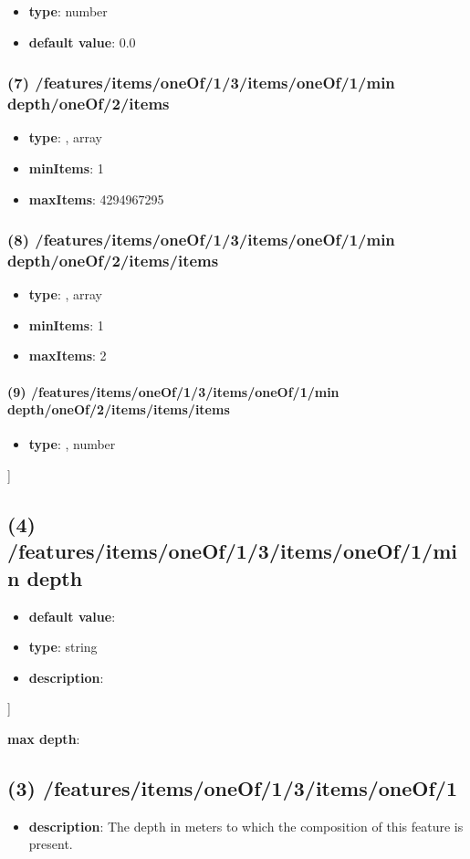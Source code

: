 \begin{itemize}[leftmargin=8em]\item {\bf type}: number\item {\bf default value}: 0.0
\end{itemize}\subsubsection{(7) /features/items/oneOf/1/3/items/oneOf/1/min depth/oneOf/2/items}
\begin{itemize}[leftmargin=7em]\item {\bf type}: , array\item {\bf minItems}: 1
\item {\bf maxItems}: 4294967295
\end{itemize}\subsubsection{(8) /features/items/oneOf/1/3/items/oneOf/1/min depth/oneOf/2/items/items}
\begin{itemize}[leftmargin=8em]\item {\bf type}: , array\item {\bf minItems}: 1
\item {\bf maxItems}: 2
\end{itemize}\paragraph{(9) /features/items/oneOf/1/3/items/oneOf/1/min depth/oneOf/2/items/items/items}
\begin{itemize}[leftmargin=9em]\item {\bf type}: , number\end{itemize}]\subsection{(4) /features/items/oneOf/1/3/items/oneOf/1/min depth}
\begin{itemize}[leftmargin=4em]\item {\bf default value}: 
\item {\bf type}: string
\item {\bf description}: 
\end{itemize}]\item {\bf max depth}: \subsection{(3) /features/items/oneOf/1/3/items/oneOf/1}
\begin{itemize}[leftmargin=3em]\item {\bf description}: The depth in meters to which the composition of this feature is present.
\end{itemize}
